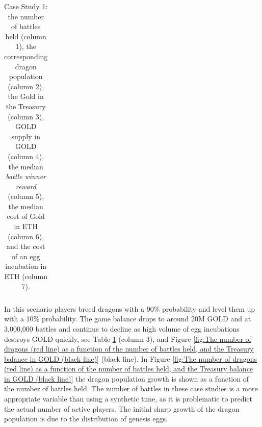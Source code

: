 \documentclass[12pt]{article}
\begin{document}
{\begin{table}[H]
\begin{tabular}{p{0.6in}p{0.64in}p{0.55in}p{0.6in}p{0.99in}p{0.94in}p{0.9in}}
\end{tabular}\caption{Case Study 1: the number of battles held (column 1), the corresponding dragon population (column 2), the Gold in the Treasury (column 3), GOLD supply in GOLD (column 4), the median {\it battle winner reward} (column 5), the median cost of Gold in ETH (column 6), and the cost of an egg incubation in ETH (column 7).}
\label{tab:Table showing the number of battles held (column 1), the corresponding dragon population (column 2), the Gold in the Treasury (column 3), the median battle winner reward (column 4), the median cost of Gold in $ (column 5), and the cost of an egg incubation (column 6).  This information is provided for the three different cases studied below. }

 \end{table}




In this scenario players breed dragons with a 90$\%$  probability and level them up with a 10$\%$  probability. The game balance drops to around 20M GOLD and at 3,000,000 battles and continue to decline as high volume of egg incubations destroys GOLD quickly, see  Table \ref{tab:Table showing the number of battles held (column 1), the corresponding dragon population (column 2), the Gold in the Treasury (column 3), the median battle winner reward (column 4), the median cost of Gold in $ (column 5), and the cost of an egg incubation (column 6).  This information is provided for the three different cases studied below. } (column 3), and Figure \ref{fig:The number of dragons (red line) as a function of the number of battles held, and the Treasury balance in GOLD (black line)} (black line). In Figure \ref{fig:The number of dragons (red line) as a function of the number of battles held, and the Treasury balance in GOLD (black line)} the dragon population growth is shown as a function of the number of battles held. The number of battles in these case studies is a more appropriate variable than using a synthetic time, as it is problematic to predict the actual number of active players. The initial sharp growth of the dragon population is due to the distribution of genesis eggs.\par




}
\end{document}
